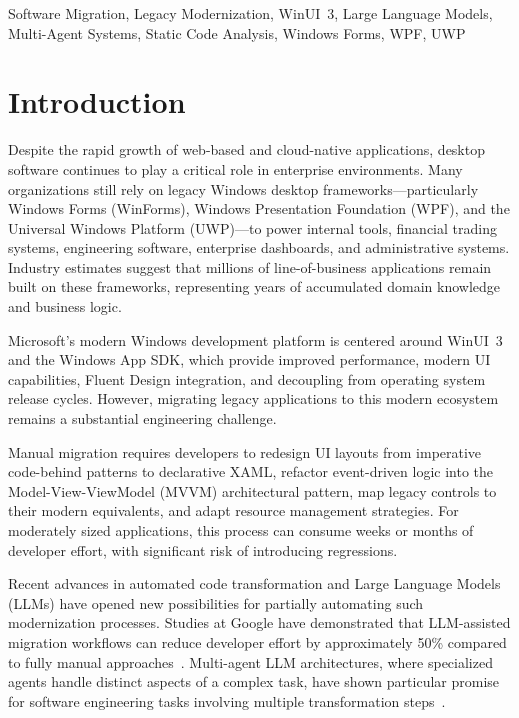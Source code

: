 \documentclass[conference]{IEEEtran}
\begin{document}
\begin{IEEEkeywords}
Software Migration, Legacy Modernization, WinUI~3, Large Language Models, Multi-Agent Systems, Static Code Analysis, Windows Forms, WPF, UWP
\end{IEEEkeywords}

\section{Introduction}

Despite the rapid growth of web-based and cloud-native applications, desktop software continues to play a critical role in enterprise environments. Many organizations still rely on legacy Windows desktop frameworks---particularly Windows Forms (WinForms), Windows Presentation Foundation (WPF), and the Universal Windows Platform (UWP)---to power internal tools, financial trading systems, engineering software, enterprise dashboards, and administrative systems. Industry estimates suggest that millions of line-of-business applications remain built on these frameworks, representing years of accumulated domain knowledge and business logic.

Microsoft's modern Windows development platform is centered around WinUI~3 and the Windows App SDK, which provide improved performance, modern UI capabilities, Fluent Design integration, and decoupling from operating system release cycles. However, migrating legacy applications to this modern ecosystem remains a substantial engineering challenge.

Manual migration requires developers to redesign UI layouts from imperative code-behind patterns to declarative XAML, refactor event-driven logic into the Model-View-ViewModel (MVVM) architectural pattern, map legacy controls to their modern equivalents, and adapt resource management strategies. For moderately sized applications, this process can consume weeks or months of developer effort, with significant risk of introducing regressions.

Recent advances in automated code transformation and Large Language Models (LLMs) have opened new possibilities for partially automating such modernization processes. Studies at Google have demonstrated that LLM-assisted migration workflows can reduce developer effort by approximately 50\% compared to fully manual approaches~\cite{ziftci2025}. Multi-agent LLM architectures, where specialized agents handle distinct aspects of a complex task, have shown particular promise for software engineering tasks involving multiple transformation steps~\cite{moti2026}.
\end{document}
